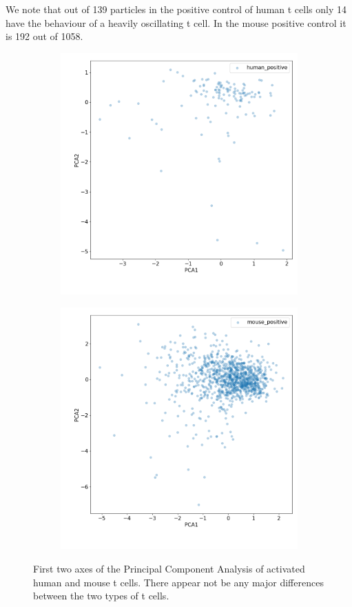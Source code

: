 We note that out of 139 particles in the positive control of human t cells only 14 have the behaviour of a heavily oscillating t cell. In the mouse positive control it is 192 out of 1058.

\begin{figure}[h]
	\centering
	\begin{subfigure}{0.49\linewidth}
		\includegraphics[width=\textwidth]{fig/positive_control_human}
	\end{subfigure}
	\hfill
	\begin{subfigure}{0.49\linewidth}
		\includegraphics[width=\textwidth]{fig/positive_control_mouse}
	\end{subfigure}
	
	\caption{First two axes of the Principal Component Analysis of activated human and mouse t cells. There appear not be any major differences between the two types of t cells.}
	\label{fig:positive_control}
\end{figure}